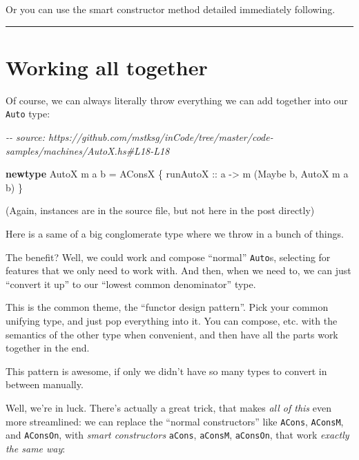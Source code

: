 \documentclass[]{article}
\newenvironment{Shaded}{}{}
\newcommand{\CommentTok}[1]{\textcolor[rgb]{0.38,0.63,0.69}{\textit{#1}}}
\newcommand{\DataTypeTok}[1]{\textcolor[rgb]{0.56,0.13,0.00}{#1}}
\newcommand{\KeywordTok}[1]{\textcolor[rgb]{0.00,0.44,0.13}{\textbf{#1}}}
\newcommand{\NormalTok}[1]{#1}
\newcommand{\OtherTok}[1]{\textcolor[rgb]{0.00,0.44,0.13}{#1}}
\begin{document}
Or you can use the smart constructor method detailed immediately following.

\begin{center}\rule{0.5\linewidth}{\linethickness}\end{center}

\hypertarget{working-all-together}{%
\section{Working all together}\label{working-all-together}}

Of course, we can always literally throw everything we can add together into our
\texttt{Auto} type:

\begin{Shaded}
\begin{Highlighting}[]
\CommentTok{{-}{-} source: https://github.com/mstksg/inCode/tree/master/code{-}samples/machines/AutoX.hs\#L18{-}L18}

\KeywordTok{newtype} \DataTypeTok{AutoX}\NormalTok{ m a b }\OtherTok{=} \DataTypeTok{AConsX}\NormalTok{ \{}\OtherTok{ runAutoX ::}\NormalTok{ a }\OtherTok{{-}>}\NormalTok{ m (}\DataTypeTok{Maybe}\NormalTok{ b, }\DataTypeTok{AutoX}\NormalTok{ m a b) \}}
\end{Highlighting}
\end{Shaded}

(Again, instances are in the source file, but not here in the post directly)

Here is a same of a big conglomerate type where we throw in a bunch of things.

The benefit? Well, we could work and compose ``normal'' \texttt{Auto}s,
selecting for features that we only need to work with. And then, when we need
to, we can just ``convert it up'' to our ``lowest common denominator'' type.

This is the common theme, the ``functor design pattern''. Pick your common
unifying type, and just pop everything into it. You can compose, etc. with the
semantics of the other type when convenient, and then have all the parts work
together in the end.

This pattern is awesome, if only we didn't have so many types to convert in
between manually.

Well, we're in luck. There's actually a great trick, that makes \emph{all of
this} even more streamlined: we can replace the ``normal constructors'' like
\texttt{ACons}, \texttt{AConsM}, and \texttt{AConsOn}, with \emph{smart
constructors} \texttt{aCons}, \texttt{aConsM}, \texttt{aConsOn}, that work
\emph{exactly the same way}:
\end{document}
